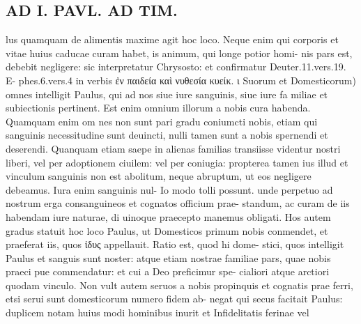 \documentclass{article}
\begin{document}
\begin{pages}
\section*{AD I. PAVL. AD TIM. }
\marginpar{[ p.266 ]}lus quamquam de alimentis maxime agit hoc loco. Neque enim qui corporis et vitae huius caducae curam habet, is animum, qui longe potior homi- nis pars est, debebit negligere: sic interpretatur Chrysosto: et confirmatur Deuter.11.vers.19. E- phes.6.vers.4 in verbis ἐν παιδεία καὶ νυθεσία κυείκ. ι Suorum et Domesticorum) omnes intelligit Paulus, qui ad nos siue iure sanguinis, siue iure fa miliae et subiectionis pertinent. Est enim omnium illorum a nobis cura habenda. Quamquam enim om nes non sunt pari gradu coniumcti nobis, etiam qui sanguinis necessitudine sunt deuincti, nulli tamen sunt a nobis spernendi et deserendi. Quanquam etiam saepe in alienas familias transiisse videntur nostri liberi, vel per adoptionem ciuilem: vel per coniugia: propterea tamen ius illud et vinculum sanguinis non est abolitum, neque abruptum, ut eos negligere debeamus. Iura enim sanguinis nul- Io modo tolli possunt. unde perpetuo ad nostrum erga consanguineos et cognatos officium prae- standum, ac curam de iis habendam iure naturae, di uinoque praecepto manemus obligati. Hos autem gradus statuit hoc loco Paulus, ut Domesticos primum nobis conmendet, et praeferat iis, quos ἰδυς appellauit. Ratio est, quod hi dome- stici, quos intelligit Paulus et sanguis sunt noster: atque etiam nostrae familiae pars, quae nobis praeci pue commendatur: et cui a Deo preficimur spe- cialiori atque arctiori quodam vinculo. Non vult autem seruos a nobis propinquis et cognatis prae ferri, etsi serui sunt domesticorum numero fidem ab- negat qui secus facitait Paulus: duplicem notam huius modi hominibus inurit et Infidelitatis ferinae vel 

\end{pages}
\end{document}
